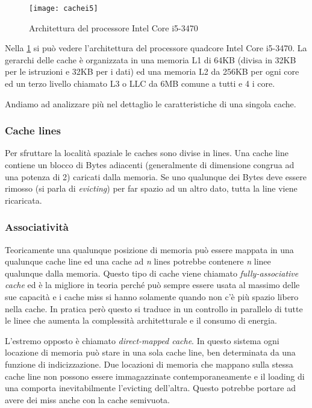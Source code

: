 			\begin{figure}
				\begin{center}
					\texttt{[image: cachei5]}
					\caption{Architettura del processore Intel Core i5-3470}
					\label{fig:cachei5}
				\end{center}
			\end{figure}
		
			Nella \ref{fig:cachei5} si può vedere l'architettura del processore quadcore Intel Core i5-3470. La gerarchi delle cache è organizzata in una memoria L1 di 64KB (divisa in 32KB per le istruzioni e 32KB per i dati) ed una memoria L2 da 256KB per ogni core ed un terzo livello chiamato L3 o \ac{LLC} da 6MB comune a tutti e 4 i core.
			
			Andiamo ad analizzare più nel dettaglio le caratteristiche di una singola cache\cite{ge2016survey,yarom2014flush+}.
			
			\subsubsection{Cache lines}
				Per sfruttare la località spaziale le caches sono divise in lines. Una cache line contiene un blocco di Bytes adiacenti (generalmente di dimensione congrua ad una potenza di 2) caricati dalla memoria. Se uno qualunque dei Bytes deve essere rimosso (si parla di \emph{evicting}) per far spazio ad un altro dato, tutta la line viene ricaricata.
				
			\subsubsection{Associatività}
				Teoricamente una qualunque posizione di memoria può essere mappata in una qualunque cache line ed una cache ad \emph{n} lines potrebbe contenere \emph{n} linee qualunque dalla memoria. Questo tipo di cache viene chiamato \emph{fully-associative cache} ed è la migliore in teoria perché può sempre essere usata al massimo delle sue capacità e i cache miss si hanno solamente quando non c'è più spazio libero nella cache. In pratica però questo si traduce in un controllo in parallelo di tutte le linee che aumenta la complessità architetturale e il consumo di energia.
				
				L'estremo opposto è chiamato \emph{direct-mapped cache}. In questo sistema ogni locazione di memoria può stare in una sola cache line, ben determinata da una funzione di indicizzazione. Due locazioni di memoria che mappano sulla stessa cache line non possono essere immagazzinate contemporaneamente e il loading di una comporta inevitabilmente l'evicting dell'altra. Questo potrebbe portare ad avere dei miss anche con la cache semivuota.
				
